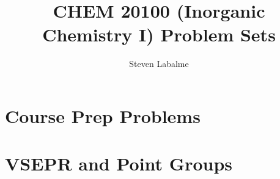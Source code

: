 \documentclass[titlepage]{article}
\title{CHEM 20100 (Inorganic Chemistry I) Problem Sets}
\author{Steven Labalme}
\begin{document}
\maketitle



\tableofcontents
\newpage



\pagestyle{main}
\renewcommand{\leftmark}{Problem Set \thesection}
\setcounter{section}{-1}
\section{Course Prep Problems}

\newpage



\section{VSEPR and Point Groups}

\end{document}
